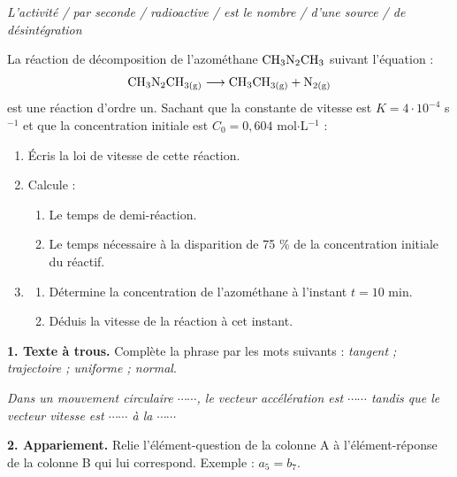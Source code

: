\documentclass[11pt]{article}
\begin{document}
\textit{L'activité / par seconde / radioactive / est le nombre / d'une source / de désintégration}

La réaction de décomposition de l'azométhane $\mathrm{CH_3N_2CH_3}$ suivant l'équation :
\[ \mathrm{CH_3N_2CH_{3(g)} \longrightarrow CH_3CH_{3(g)} + N_{2(g)}} \]
est une réaction d'ordre un. Sachant que la constante de vitesse est $K = 4\cdot10^{-4}$ s$^{-1}$ et que la concentration initiale est $C_0 = 0{,}604$ mol$\cdot$L$^{-1}$ :

\begin{enumerate}
  \item Écris la loi de vitesse de cette réaction.
  \item Calcule :
  \begin{enumerate}[label=\alph*.]
    \item Le temps de demi-réaction.
    \item Le temps nécessaire à la disparition de 75 \% de la concentration initiale du réactif.
  \end{enumerate}
  \item \begin{enumerate}[label=\alph*.]
    \item Détermine la concentration de l'azométhane à l'instant $t = 10$ min.
    \item Déduis la vitesse de la réaction à cet instant.
  \end{enumerate}
\end{enumerate}



\noindent\textbf{1. Texte à trous.} Complète la phrase par les mots suivants : \textit{tangent ; trajectoire ; uniforme ; normal}.

\textit{Dans un mouvement circulaire $\cdots\cdots$, le vecteur accélération est $\cdots\cdots$ tandis que le vecteur vitesse est $\cdots\cdots$ à la $\cdots\cdots$}

\medskip
\noindent\textbf{2. Appariement.} Relie l'élément-question de la colonne A à l'élément-réponse de la colonne B qui lui correspond. Exemple : $a_5 = b_7$.
\end{document}
